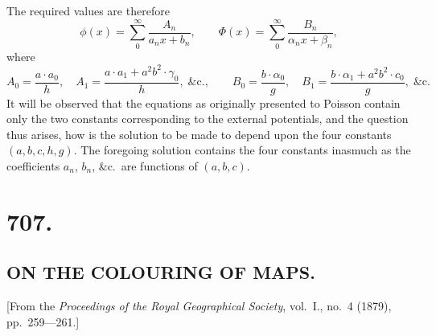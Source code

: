 \documentclass[12pt,a4paper,oneside]{book}
\theoremstyle{plain}
\theoremstyle{definition}
\theoremstyle{remark}
\begin{document}
The required values are therefore
\[
\phi(x) = \sum_0^\infty\frac{A_n}{a_n x+b_n},\qquad
\Phi(x) = \sum_0^\infty\frac{B_n}{\alpha_n x+\beta_n},
\]
where
\[
A_0 = \frac{a\cdot a_0}{h},\quad
A_1 = \frac{a\cdot a_1 + a^2b^2\cdot\gamma_0}{h},\;\&\text{c.},\qquad
B_0 = \frac{b\cdot\alpha_0}{g},\quad
B_1 = \frac{b\cdot\alpha_1 + a^2b^2\cdot c_0}{g},\;\&\text{c.}
\]
It will be observed that the equations as originally presented to Poisson contain only the two constants corresponding to the external potentials, and the question thus arises, how is the solution to be made to depend upon the four constants $(a, b, c, h, g)$. The foregoing solution contains the four constants inasmuch as the coefficients $a_n$, $b_n$, $\&$c.\ are functions of $(a, b, c)$.

\vspace{2em}
\noindent\dotfill
\cleardoublepage

\section*{707.}
\subsection*{ON THE COLOURING OF MAPS.}

\begin{center}
[From the \textit{Proceedings of the Royal Geographical Society}, vol.~I., no.~4 (1879),\\ pp.~259---261.]
\end{center}
\medskip
\end{document}
